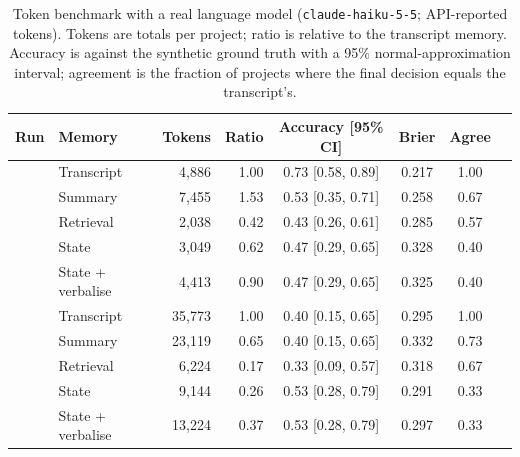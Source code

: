 \documentclass[11pt]{article}
\theoremstyle{definition}
\theoremstyle{remark}
\begin{document}
\begin{table}[t]
\centering
\caption{Token benchmark with a real language model (\texttt{claude-haiku-5-5}; API-reported tokens). Tokens are totals per project; ratio is relative to the transcript memory. Accuracy is against the synthetic ground truth with a 95\% normal-approximation interval; agreement is the fraction of projects where the final decision equals the transcript's.}
\label{tab:tokens}
\small
\begin{tabular}{llrrcccc}
\toprule
Run & Memory & Tokens & Ratio & Accuracy [95\% CI] & Brier & Agree\\
\midrule
{}
 & Transcript & 4{,}886 & 1.00 & 0.73 [0.58, 0.89] & 0.217 & 1.00\\
 & Summary & 7{,}455 & 1.53 & 0.53 [0.35, 0.71] & 0.258 & 0.67\\
 & Retrieval & 2{,}038 & 0.42 & 0.43 [0.26, 0.61] & 0.285 & 0.57\\
 & State & 3{,}049 & 0.62 & 0.47 [0.29, 0.65] & 0.328 & 0.40\\
 & State + verbalise & 4{,}413 & 0.90 & 0.47 [0.29, 0.65] & 0.325 & 0.40\\
\midrule
{}
 & Transcript & 35{,}773 & 1.00 & 0.40 [0.15, 0.65] & 0.295 & 1.00\\
 & Summary & 23{,}119 & 0.65 & 0.40 [0.15, 0.65] & 0.332 & 0.73\\
 & Retrieval & 6{,}224 & 0.17 & 0.33 [0.09, 0.57] & 0.318 & 0.67\\
 & State & 9{,}144 & 0.26 & 0.53 [0.28, 0.79] & 0.291 & 0.33\\
 & State + verbalise & 13{,}224 & 0.37 & 0.53 [0.28, 0.79] & 0.297 & 0.33\\
\bottomrule
\end{tabular}
\end{table}
\end{document}
